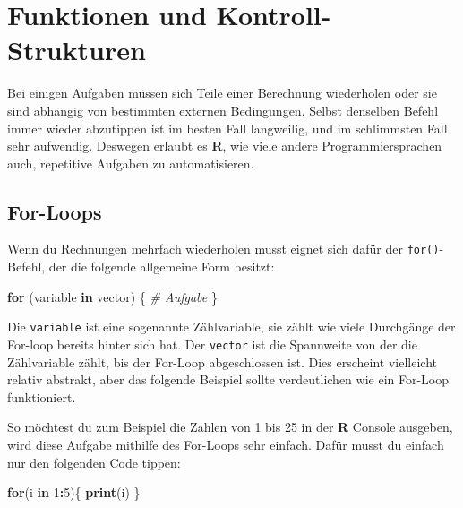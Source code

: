 \documentclass[
]{book}
\newenvironment{Shaded}{\begin{snugshade}}{\end{snugshade}}
\newcommand{\CommentTok}[1]{\textcolor[rgb]{0.56,0.35,0.01}{\textit{#1}}}
\newcommand{\ControlFlowTok}[1]{\textcolor[rgb]{0.13,0.29,0.53}{\textbf{#1}}}
\newcommand{\DecValTok}[1]{\textcolor[rgb]{0.00,0.00,0.81}{#1}}
\newcommand{\KeywordTok}[1]{\textcolor[rgb]{0.13,0.29,0.53}{\textbf{#1}}}
\newcommand{\NormalTok}[1]{#1}
\newcommand{\OperatorTok}[1]{\textcolor[rgb]{0.81,0.36,0.00}{\textbf{#1}}}
\begin{document}
\hypertarget{funktionen-und-kontroll-strukturen}{%
\chapter{Funktionen und Kontroll-Strukturen}\label{funktionen-und-kontroll-strukturen}}

Bei einigen Aufgaben müssen sich Teile einer Berechnung wiederholen oder sie sind abhängig von bestimmten externen Bedingungen.
Selbst denselben Befehl immer wieder abzutippen ist im besten Fall langweilig, und im schlimmsten Fall sehr aufwendig.
Deswegen erlaubt es \textbf{R}, wie viele andere Programmiersprachen auch, repetitive Aufgaben zu automatisieren.

\hypertarget{for-loops}{%
\section{For-Loops}\label{for-loops}}

Wenn du Rechnungen mehrfach wiederholen musst eignet sich dafür der \texttt{for()}-Befehl, der die folgende
allgemeine Form besitzt:

\begin{Shaded}
\begin{Highlighting}[]
\ControlFlowTok{for}\NormalTok{ (variable }\ControlFlowTok{in}\NormalTok{ vector) \{}
  \CommentTok{# Aufgabe}
\NormalTok{\}}
\end{Highlighting}
\end{Shaded}

Die \texttt{variable} ist eine sogenannte Zählvariable, sie zählt wie viele Durchgänge der For-loop bereits hinter sich hat.
Der \texttt{vector} ist die Spannweite von der die Zählvariable zählt, bis der For-Loop abgeschlossen ist.
Dies erscheint vielleicht relativ abstrakt, aber das folgende Beispiel sollte verdeutlichen wie ein For-Loop funktioniert.

So möchtest du zum Beispiel die Zahlen von 1 bis 25 in der \textbf{R} Console ausgeben, wird diese Aufgabe mithilfe des For-Loops sehr einfach.
Dafür musst du einfach nur den folgenden Code tippen:

\begin{Shaded}
\begin{Highlighting}[]
\ControlFlowTok{for}\NormalTok{(i }\ControlFlowTok{in} \DecValTok{1}\OperatorTok{:}\DecValTok{5}\NormalTok{)\{}
  \KeywordTok{print}\NormalTok{(i)}
\NormalTok{\}}
\end{Highlighting}
\end{Shaded}
\end{document}

